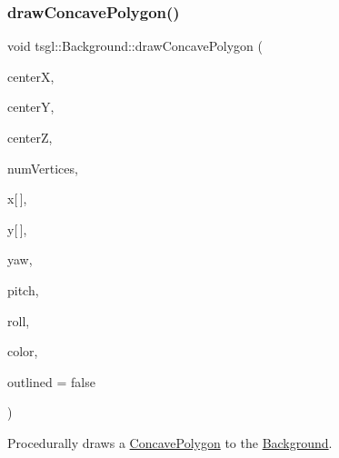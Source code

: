 \subsubsection{\texorpdfstring{draw\+Concave\+Polygon()}{drawConcavePolygon()}\hspace{0.1cm}{\footnotesize\ttfamily [1/2]}}
{\footnotesize\ttfamily void tsgl\+::\+Background\+::draw\+Concave\+Polygon (\begin{DoxyParamCaption}\item[{float}]{centerX,  }\item[{float}]{centerY,  }\item[{float}]{centerZ,  }\item[{int}]{num\+Vertices,  }\item[{float}]{x\mbox{[}$\,$\mbox{]},  }\item[{float}]{y\mbox{[}$\,$\mbox{]},  }\item[{float}]{yaw,  }\item[{float}]{pitch,  }\item[{float}]{roll,  }\item[{\hyperlink{structtsgl_1_1_color_float}{Color\+Float}}]{color,  }\item[{bool}]{outlined = {\ttfamily false} }\end{DoxyParamCaption})\hspace{0.3cm}{\ttfamily [virtual]}}



Procedurally draws a \hyperlink{classtsgl_1_1_concave_polygon}{Concave\+Polygon} to the \hyperlink{classtsgl_1_1_background}{Background}. 

